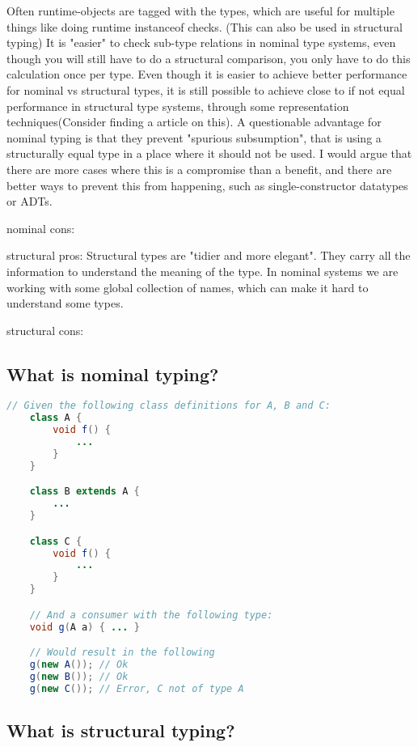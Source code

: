 Often runtime-objects are tagged with the types, which are useful for multiple things like doing runtime instanceof checks. (This can also be used in structural typing)
It is "easier" to check sub-type relations in nominal type systems, even though you will still have to do a structural comparison, you only have to do this calculation once per type.
    Even though it is easier to achieve better performance for nominal vs structural types, it is still possible to achieve close to if not equal performance in structural type systems, through some representation techniques(Consider finding a article on this).
A questionable advantage for nominal typing is that they prevent "spurious subsumption", that is using a structurally equal type in a place where it should not be used.
    I would argue that there are more cases where this is a compromise than a benefit, and there are better ways to prevent this from happening, such as single-constructor datatypes or ADTs.

nominal cons:

structural pros:
Structural types are "tidier and more elegant".
    They carry all the information to understand the meaning of the type.
    In nominal systems we are working with some global collection of names, which can make it hard to understand some types.


structural cons:


\subsection{What is nominal typing?}\label{subsec:what-is-nominal-typing?}



\begin{lstlisting}[label={lst:nominal-typing-example}, language=Java]
    // Given the following class definitions for A, B and C:
    class A {
        void f() {
            ...
        }
    }

    class B extends A {
        ...
    }

    class C {
        void f() {
            ...
        }
    }

    // And a consumer with the following type:
    void g(A a) { ... }

    // Would result in the following
    g(new A()); // Ok
    g(new B()); // Ok
    g(new C()); // Error, C not of type A
\end{lstlisting}

\subsection{What is structural typing?}\label{subsec:what-is-structural-typing?}

